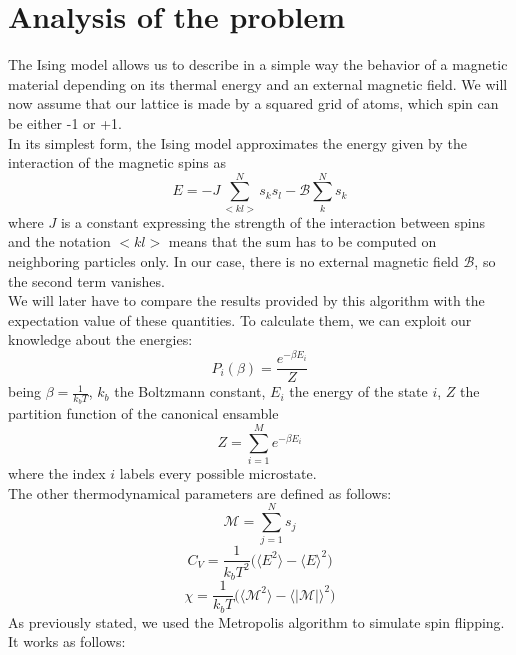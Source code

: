 \documentclass[10pt,a4paper,titlepage]{article}
\begin{document}
\section*{Analysis of the problem}
\noindent The Ising model allows us to describe in a simple way the behavior of a magnetic material depending on its thermal energy and an external magnetic field. We will now assume that our lattice is made by a squared grid of atoms, which spin can be either -1 or +1. \\ 
In its simplest form, the Ising model approximates the energy given by the interaction of the magnetic spins as 
\begin{equation}
E= -J \sum_{<kl>}^{N}s_{k}s_{l}- 
\mathscr{B} 
\sum_{k}^{N}s_{k}
\end{equation}
where $J$ is a constant expressing the strength of the interaction between spins and the notation $<kl>$ means that the sum has to be computed on neighboring particles only. In our case, there is no external magnetic field $\mathscr{B}$, so the second term vanishes. \\
We will later have to compare the results provided by this algorithm with the expectation value of these quantities. To calculate them, we can exploit our knowledge about the energies: 
\begin{equation}
P_{i}(\beta)=\frac{e^{-\beta E_{i}}}{Z}
\end{equation}
being $\beta = \frac{1}{k_{b}T}$, $k_{b}$ the Boltzmann constant, $E_{i}$ the energy of the state $i$, $Z$ the partition function of the canonical ensamble 
\begin{equation}
Z = \sum_{i=1}^{M}e^{-\beta E_{i}}
\end{equation}
where the index $i$ labels every possible microstate.\\
The other thermodynamical parameters are defined as follows:
\begin{equation}
\mathscr{M} = \sum_{j=1}^{N}s_{j}
\end{equation}
\begin{equation}
C_{V}=\frac{1}{k_{b}T^{2}}\big( \langle E^{2} \rangle - \langle E \rangle ^{2} \big)
\end{equation}
\begin{equation}
\chi = \frac{1}{k_{b}T} \big( \langle \mathscr{M}^{2} \rangle - \langle \mathscr{|M|} \rangle ^{2} \big)
\end{equation}
As previously stated, we used the Metropolis algorithm to simulate spin flipping. It works as follows: 
\end{document}
